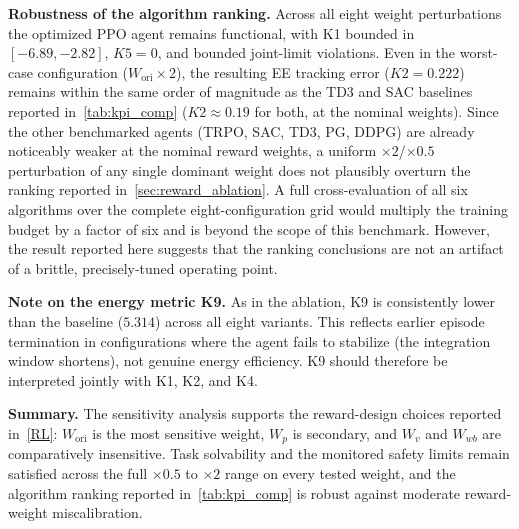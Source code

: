 \documentclass{ieeeaccess}
\begin{document}
\noindent\textbf{Robustness of the algorithm ranking.} Across all eight weight perturbations the optimized PPO
agent remains functional, with K1 bounded in $[-6.89, -2.82]$, $K5=0$, and bounded joint-limit violations.
Even
in the worst-case configuration ($W_{\mathrm{ori}}\times 2$), the resulting EE tracking error ($K2=0.222$) remains
within the same order of magnitude as the TD3 and SAC baselines reported in~\autoref{tab:kpi_comp}
($K2 \approx 0.19$
for both, at the nominal weights). Since the other benchmarked agents (TRPO, SAC, TD3,
PG, DDPG) are already
noticeably weaker at the nominal reward weights, a uniform $\times 2$/$\times 0.5$ perturbation of
any single
dominant weight does not plausibly overturn the ranking reported in~\autoref{sec:reward_ablation}. A full
cross-evaluation of all six algorithms over the complete eight-configuration grid would multiply the training
budget by a factor of six and is beyond the scope of this benchmark.
However, the result reported here
suggests that the ranking conclusions are not an artifact of a brittle, precisely-tuned operating
point.

\noindent\textbf{Note on the energy metric K9.} As in the ablation, K9 is consistently lower
than the baseline
($5.314$) across all eight variants. This reflects earlier episode termination in configurations where the
agent
fails to stabilize (the integration window shortens), not genuine energy efficiency. K9 should therefore
be
interpreted jointly with K1, K2, and K4.

\noindent\textbf{Summary.} The sensitivity analysis supports the reward-design choices reported in~\autoref{RL}:
$W_{\mathrm{ori}}$ is the most sensitive weight, $W_p$ is secondary, and $W_v$ and $W_{wb}$ are
comparatively
insensitive. Task solvability and the monitored safety limits remain satisfied across the full $\times 0.5$
to $\times 2$
range on every tested weight, and the algorithm ranking reported in~\autoref{tab:kpi_comp} is robust against
moderate reward-weight miscalibration.
\end{document}
